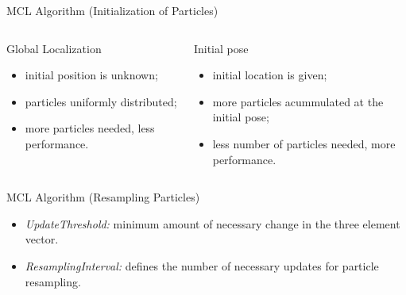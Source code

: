 \begin{frame}{MCL Algorithm (Initialization of Particles)}

    \begin{columns}
        \begin{column}{0.45\textwidth}
            \begin{block}{Global Localization}
                \begin{itemize}
                    \item initial position is unknown;
                    \item particles uniformly distributed;
                    \item more particles needed, less performance.
                \end{itemize}
            \end{block}
        \end{column}
        \hfill
        \begin{column}{0.45\textwidth}
            \begin{block}{Initial pose}
                \begin{itemize}
                    \item initial location is given;
                    \item more particles acummulated at the initial pose;
                    \item less number of particles needed, more performance.
                \end{itemize}
            \end{block}
        \end{column}
    \end{columns}
    
\end{frame}


\begin{frame}{MCL Algorithm (Resampling Particles)}

    \begin{itemize}
        \item {\itshape UpdateThreshold:} minimum amount of necessary change in the three element vector.
        \item {\itshape ResamplingInterval:} defines the number of necessary updates for particle resampling.
    \end{itemize}
    
\end{frame}